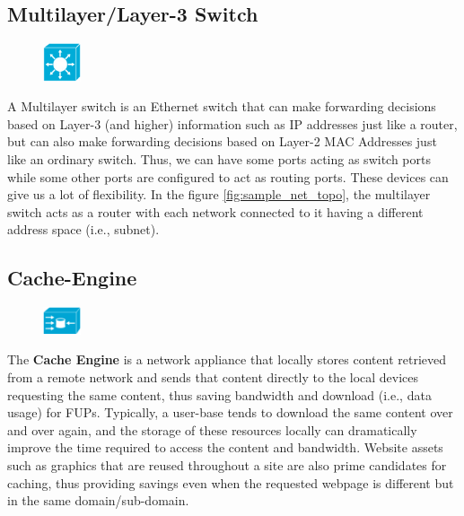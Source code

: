 \subsection{Multilayer/Layer-3 Switch}
\begin{figure}
	\centering
	\vspace{-10pt}
	\includegraphics[width=0.1\textwidth]{"Mod1/chapters/1.2.b Network Icons/1.2.b.10 Layer-3 Switch"}
	\vspace{-10pt}
\end{figure}
A Multilayer switch is an Ethernet switch that can make forwarding decisions based on Layer-3 (and higher) information such as IP addresses just like a router, but can also make forwarding decisions based on Layer-2 MAC Addresses just like an ordinary switch. Thus, we can have some ports acting as switch ports while some other ports are configured to act as routing ports. These devices can give us a lot of flexibility. In the figure \ref{fig:sample_net_topo}, the multilayer switch acts as a router with each network connected to it having a different address space (i.e., subnet). 

\subsection{Cache-Engine}
\begin{figure}
	\centering
	\vspace{-10pt}
	\includegraphics[width=0.1\textwidth]{"Mod1/chapters/1.2.b Network Icons/1.2.b.11 Cache-engine"}
	\vspace{-10pt}
\end{figure}
The \textbf{Cache Engine} is a network appliance that locally stores content retrieved from a remote network and sends that content directly to the local devices requesting the same content, thus saving bandwidth and download (i.e., data usage) for FUPs. Typically, a user-base tends to download the same content over and over again, and the storage of these resources locally can dramatically improve the time required to access the content and bandwidth. Website assets such as graphics that are reused throughout a site are also prime candidates for caching, thus providing savings even when the requested webpage is different but in the same domain/sub-domain. 

